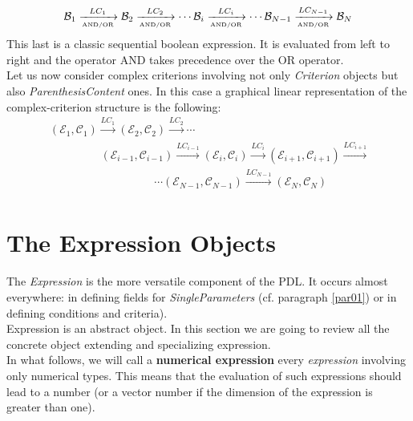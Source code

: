 \documentclass[a4paper,11pt] {article}
\begin{document}
\begin{equation}
\mathcal B_1 \xrightarrow[{\mbox{\tiny AND/OR}}]{LC_1} 
\mathcal B_2 \xrightarrow[{\mbox{\tiny AND/OR}}]{LC_2}
\cdots 
\mathcal B_i \xrightarrow[{\mbox{\tiny AND/OR}}]{LC_i}
\cdots 
\mathcal B_{N-1} \xrightarrow[{\mbox{\tiny AND/OR}}]{LC_{N-1}}
\mathcal B_N
\end{equation}
This last is a classic sequential boolean expression. It is evaluated from left to right and the operator AND takes precedence over the OR operator.\\

Let us now consider complex criterions involving not only {\it Criterion} objects but also {\it ParenthesisContent} ones. In this case a graphical linear representation of the complex-criterion structure is the following:
\begin{equation}
\begin{array}{l}
\ (\mathcal E_1, \mathcal C_1) \xrightarrow{LC_1} 
(\mathcal E_2, \mathcal C_2) \xrightarrow{LC_2}
\cdots 
\\
\hspace{2cm}(\mathcal E_{i-1}, \mathcal C_{i-1}) \xrightarrow{LC_{i-1}}
(\mathcal E_i, \mathcal C_i) \xrightarrow{LC_i}
(\mathcal E_{i+1}, \mathcal C_{i+1}) \xrightarrow{LC_{i+1}}\\
 \hspace{4cm} \cdots (\mathcal E_{N-1}, \mathcal C_{N-1}) \xrightarrow{LC_{N-1}}
(\mathcal E_N, \mathcal C_N)\\
\end{array}
\end{equation}




\section{The Expression Objects}\label{par02}
The {\it Expression} is the more versatile component of the PDL. It occurs almost everywhere: in defining fields for {\it SingleParameters} (cf. paragraph \ref{par01}) or in defining conditions and criteria).\\
Expression is an abstract object. In this section we are going to review all the concrete object extending and specializing expression.\\

 In what follows, we will call a {\bf numerical expression} every {\it expression} involving only numerical types. This means that the evaluation of such expressions should lead to a number (or a vector number if the dimension of the expression is greater than one).\\
\end{document}
